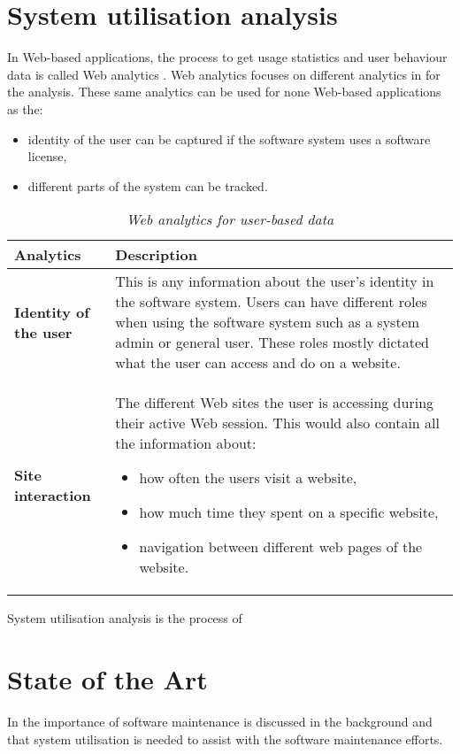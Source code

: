 \section{System utilisation analysis}\label{sec:ch1_systemUtilisation}
In Web-based applications, the process to get usage statistics and user behaviour data is called Web analytics \cite{Kocsis2012}. Web analytics focuses on different analytics in  for the analysis. These same analytics can be used for none Web-based applications as the: 

\begin{itemize}
	\item identity of the user can be captured if the software system uses a software license,
	\item different parts of the system can be tracked.
\end{itemize} 

\begin{table}[!htb]
	\centering
	\caption[Web analytics for user-based data]
	{\textit{Web analytics for user-based data}}
	\label{tbl:ch1_webAnalytics}
	\begin{tabularx}{\textwidth}{|l|X|}
		\hline \textbf{Analytics}  & \textbf{Description} \\
		\hline \textbf{Identity of the user} & This is any information about the user's identity in the software system. Users can have different roles when using the software system such as a system admin or general user. These roles mostly dictated what the user can access and do on a website. \\
		\hline \textbf{Site interaction} & The different Web sites the user is accessing during their active Web session. This would also contain all the information about: 
		\begin{itemize}
			\item how often the users visit a website,
			\item how much time they spent on a specific website,
			\item navigation between different web pages of the website.
		\end{itemize}
		\\
		\hline
	\end{tabularx}
\end{table}

System utilisation analysis is the process of

\clearpage

\section{State of the Art}
In  the importance of software maintenance is discussed in the background and that system utilisation is needed to assist with the software maintenance efforts.

